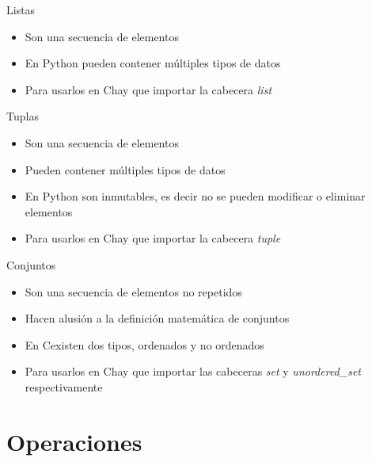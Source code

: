 \documentclass{beamer}
\newcommand{\Rplus}{\protect\hspace{-.1em}\protect\raisebox{.35ex}{\smaller{\smaller\textbf{+}}}}
\newcommand{\Cpp}{\mbox{C\Rplus\Rplus}\hspace{3pt}}
\begin{document}
\begin{frame}{Listas}
    \begin{itemize}
        \item Son una secuencia de elementos
        \item En Python pueden contener m\'ultiples tipos de datos
        \item Para usarlos en \Cpp hay que importar la cabecera \textit{list}
    \end{itemize}
\end{frame}

\begin{frame}{Tuplas}
    \begin{itemize}
        \item Son una secuencia de elementos
        \item Pueden contener m\'ultiples tipos de datos
        \item En Python son inmutables, es decir no se pueden modificar o eliminar elementos
        \item Para usarlos en \Cpp hay que importar la cabecera \textit{tuple}
    \end{itemize}
\end{frame}

\begin{frame}{Conjuntos}
    \begin{itemize}
        \item Son una secuencia de elementos no repetidos
        \item Hacen alusi\'on a la definici\'on matem\'atica de conjuntos
        \item En \Cpp existen dos tipos, ordenados y no ordenados
        \item Para usarlos en \Cpp hay que importar las cabeceras \textit{set} y \textit{unordered\_set} respectivamente\nocite{BHASIN,BJARNE1,BJARNE2,CAIRO,CPP,DEITEL,DOWNEY,JAWORSKI,KENN,lAAKMANN,MATTHES,RAMALHO,SED}
    \end{itemize}
\end{frame}

\section{Operaciones}
\end{document}
